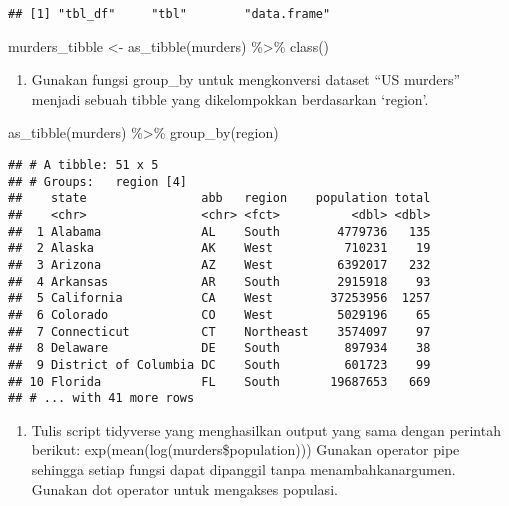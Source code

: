 \documentclass[
]{article}
\newenvironment{Shaded}{\begin{snugshade}}{\end{snugshade}}
\newcommand{\FunctionTok}[1]{\textcolor[rgb]{0.00,0.00,0.00}{#1}}
\newcommand{\NormalTok}[1]{#1}
\newcommand{\OtherTok}[1]{\textcolor[rgb]{0.56,0.35,0.01}{#1}}
\newcommand{\SpecialCharTok}[1]{\textcolor[rgb]{0.00,0.00,0.00}{#1}}
\providecommand{\tightlist}{%
  \setlength{\itemsep}{0pt}\setlength{\parskip}{0pt}}
\begin{document}
\begin{verbatim}
## [1] "tbl_df"     "tbl"        "data.frame"
\end{verbatim}

\begin{Shaded}
\begin{Highlighting}[]
\NormalTok{murders\_tibble }\OtherTok{\textless{}{-}} \FunctionTok{as\_tibble}\NormalTok{(murders) }\SpecialCharTok{\%\textgreater{}\%} \FunctionTok{class}\NormalTok{() }
\end{Highlighting}
\end{Shaded}

\begin{enumerate}
\def\labelenumi{\arabic{enumi}.}
\setcounter{enumi}{1}
\tightlist
\item
  Gunakan fungsi group\_by untuk mengkonversi dataset ``US murders''
  menjadi sebuah tibble yang dikelompokkan berdasarkan `region'.
\end{enumerate}

\begin{Shaded}
\begin{Highlighting}[]
\FunctionTok{as\_tibble}\NormalTok{(murders) }\SpecialCharTok{\%\textgreater{}\%} \FunctionTok{group\_by}\NormalTok{(region)}
\end{Highlighting}
\end{Shaded}

\begin{verbatim}
## # A tibble: 51 x 5
## # Groups:   region [4]
##    state                abb   region    population total
##    <chr>                <chr> <fct>          <dbl> <dbl>
##  1 Alabama              AL    South        4779736   135
##  2 Alaska               AK    West          710231    19
##  3 Arizona              AZ    West         6392017   232
##  4 Arkansas             AR    South        2915918    93
##  5 California           CA    West        37253956  1257
##  6 Colorado             CO    West         5029196    65
##  7 Connecticut          CT    Northeast    3574097    97
##  8 Delaware             DE    South         897934    38
##  9 District of Columbia DC    South         601723    99
## 10 Florida              FL    South       19687653   669
## # ... with 41 more rows
\end{verbatim}

\begin{enumerate}
\def\labelenumi{\arabic{enumi}.}
\setcounter{enumi}{2}
\tightlist
\item
  Tulis script tidyverse yang menghasilkan output yang sama dengan
  perintah berikut: exp(mean(log(murders\$population))) Gunakan operator
  pipe sehingga setiap fungsi dapat dipanggil tanpa menambahkanargumen.
  Gunakan dot operator untuk mengakses populasi.
\end{enumerate}
\end{document}
